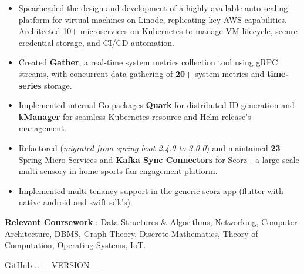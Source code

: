 \documentclass[10pt,a4paper,ragged2e]{classes/altacv}
\begin{document}
\begin{itemize}[itemsep=6pt]
\normalsize

\item Spearheaded the design and development of a highly available auto-scaling platform for virtual machines on Linode, replicating key AWS capabilities. Architected 10+ microservices on Kubernetes to manage VM lifecycle, secure credential storage, and CI/CD automation.

\item Created \textbf{Gather}, a real-time system metrics collection tool using gRPC streams, with concurrent data gathering of \textbf{20+} system metrics and \textbf{time-series} storage.

\item Implemented internal Go packages \textbf{Quark} for distributed ID generation and \textbf{kManager} for seamless Kubernetes resource and Helm release's management.

\end{itemize}
\vspace{6pt}

\begin{itemize}[itemsep=6pt]
\normalsize
\item Refactored (\textit{migrated from spring boot 2.4.0 to 3.0.0}) and maintained \textbf{23} Spring Micro Services and \textbf{Kafka Sync Connectors} for Scorz - a large-scale multi-sensory in-home sports fan engagement platform.
\item Implemented multi tenancy support in the generic scorz app (flutter with native android and swift sdk's).
\end{itemize}

\smallskip
\normalsize
\textbf{Relevant Coursework} : Data Structures \& Algorithms, Networking, Computer Architecture, DBMS, Graph Theory, Discrete Mathematics, Theory of Computation, Operating Systems, IoT.

\vspace{16pt}
\smallskip
\begin{footnotesize}
GitHub \number \month .\number\year.__VERSION__
\end{footnotesize}

\clearpage
\end{document}
